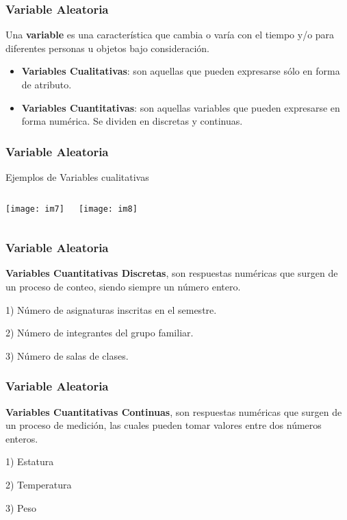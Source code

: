\documentclass[spanish]{beamer}
\begin{document}
\begin{frame}
\frametitle{Variable Aleatoria}
Una \textbf{variable} es una característica que cambia o varía con el tiempo y/o para diferentes personas u objetos bajo consideración.
\begin{itemize}
\item \textbf{Variables Cualitativas}: son aquellas que pueden expresarse sólo en forma de atributo.
\item \textbf{Variables Cuantitativas}: son aquellas variables que pueden expresarse en forma numérica. Se
dividen en discretas y continuas.
\end{itemize}

\end{frame}
\begin{frame}
\frametitle{Variable Aleatoria}
Ejemplos de Variables cualitativas
\vspace{1em}
\begin{columns}
\texttt{[image: im7]}

\texttt{[image: im8]}

\end{columns}
\end{frame}
\begin{frame}
\frametitle{Variable Aleatoria}
\textbf{Variables Cuantitativas Discretas}, son respuestas numéricas que surgen de un proceso de conteo, siendo siempre un número entero.\vspace{1em}

1) Número de asignaturas inscritas en el semestre.

2) Número de integrantes del grupo familiar.

3) Número de salas de clases.

\end{frame}
\begin{frame}
\frametitle{Variable Aleatoria}
\textbf{Variables Cuantitativas Continuas}, son respuestas numéricas que surgen de un proceso de medición, las cuales pueden tomar valores entre dos números enteros.\vspace{1em}

1) Estatura

2) Temperatura

3) Peso

\end{frame}
\end{document}
